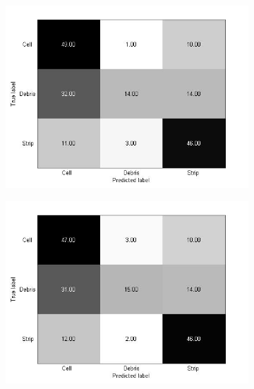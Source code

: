 \begin{figure}[!h]
\centering
  \begin{subfigure}[b]{0.3\textwidth}
    \includegraphics[width=\textwidth]{confusion_matrix/fig3_4_a.jpg}
    \caption{}
  \end{subfigure}
  \begin{subfigure}[b]{0.3\textwidth}
    \includegraphics[width=\textwidth]{confusion_matrix/fig3_4_b.jpg}
    \caption{}
  \end{subfigure}
  \begin{subfigure}[b]{0.3\textwidth}

\end{subfigure}
\end{figure}
